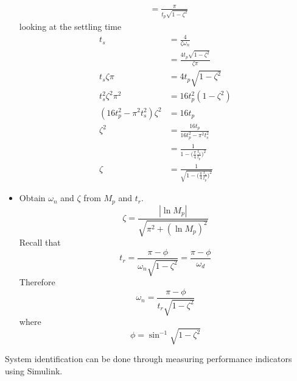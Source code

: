 \documentclass[12pt,letter]{article}
\begin{document}
\begin{itemize}
\begin{align}
&= \frac{\pi}{t_p \sqrt{1-\zeta^2}} \nonumber 
\end{align}
looking at the settling time
\begin{align}
t_s &= \frac{4}{\zeta \omega_n}  \\
&= \frac{4 t_p \sqrt{1-\zeta^2}}{\zeta \pi} \nonumber \\
t_s \zeta \pi &= 4 t_p \sqrt{1-\zeta^2} \nonumber \\
t_s^2 \zeta^2 \pi^2 &= 16 t_p^2(1- \zeta^2) \nonumber \\
(16 t_p^2-\pi^2 t_s^2) \zeta^2 &= 16 t_p \nonumber \\
\zeta^2 &= \frac{16 t_p}{16 t_p^2-\pi^2 t_s^2} \nonumber \\
 &= \frac{1}{1-\big(\frac{\pi}{4}\frac{t_s}{t_p}\big)^2} \nonumber \\
\zeta &= \frac{1}{\sqrt{1-\big(\frac{\pi}{4}\frac{t_s}{t_p}\big)^2}} \nonumber 
\end{align}
\item Obtain $\omega_n$ and $\zeta$ from $M_p$ and $t_r$.  
\begin{equation}
\zeta = \frac{|\ln M_p|}{\sqrt{\pi^2 + (\ln M_p)^2}}
\end{equation}
Recall that 
\begin{equation}
t_r = \frac{\pi - \phi}{\omega_n \sqrt{1-\zeta^2}} = \frac{\pi - \phi}{\omega_d}
\end{equation}
Therefore
\begin{equation}
\omega_n = \frac{\pi - \phi}{t_r \sqrt{1-\zeta^2}}
\end{equation}
where 
\begin{equation}
\phi = \sin^{-1} \sqrt{1-\zeta^2}
\end{equation}
\end{itemize}



System identification can be done through measuring performance indicators using Simulink.
\end{document}
